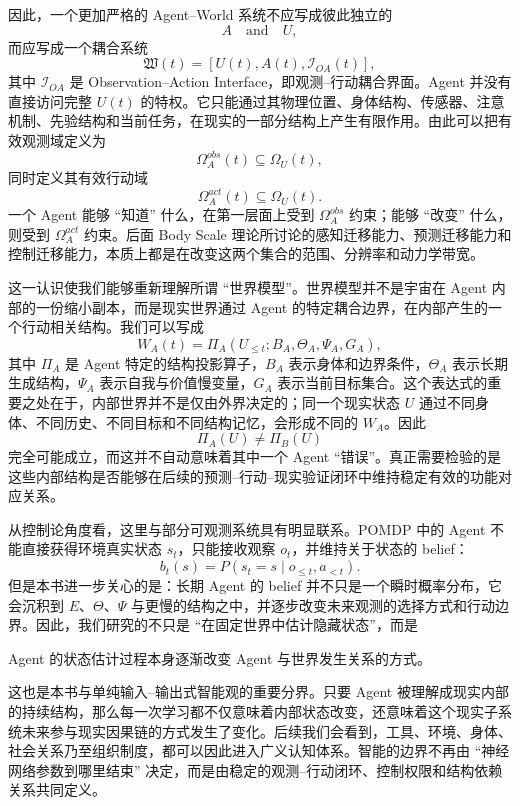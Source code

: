 因此，一个更加严格的 Agent--World 系统不应写成彼此独立的
\[
A \quad \text{and} \quad U,
\]
而应写成一个耦合系统
\[
\mathfrak{W}(t)
=
\left[
U(t),A(t),\mathcal{I}_{OA}(t)
\right],
\]
其中 $\mathcal{I}_{OA}$ 是 Observation--Action Interface，即观测--行动耦合界面。Agent 并没有直接访问完整 $U(t)$ 的特权。它只能通过其物理位置、身体结构、传感器、注意机制、先验结构和当前任务，在现实的一部分结构上产生有限作用。由此可以把有效观测域定义为
\[
\Omega_A^{obs}(t)
\subseteq
\Omega_U(t),
\]
同时定义其有效行动域
\[
\Omega_A^{act}(t)
\subseteq
\Omega_U(t).
\]
一个 Agent 能够 ``知道'' 什么，在第一层面上受到 $\Omega_A^{obs}$ 约束；能够 ``改变'' 什么，则受到 $\Omega_A^{act}$ 约束。后面 Body Scale 理论所讨论的感知迁移能力、预测迁移能力和控制迁移能力，本质上都是在改变这两个集合的范围、分辨率和动力学带宽。

这一认识使我们能够重新理解所谓 ``世界模型''。世界模型并不是宇宙在 Agent 内部的一份缩小副本，而是现实世界通过 Agent 的特定耦合边界，在内部产生的一个行动相关结构。我们可以写成
\[
W_A(t)
=
\Pi_A
\left(
U_{\leq t};
B_A,
\Theta_A,
\Psi_A,
G_A
\right),
\]
其中 $\Pi_A$ 是 Agent 特定的结构投影算子，$B_A$ 表示身体和边界条件，$\Theta_A$ 表示长期生成结构，$\Psi_A$ 表示自我与价值慢变量，$G_A$ 表示当前目标集合。这个表达式的重要之处在于，内部世界并不是仅由外界决定的；同一个现实状态 $U$ 通过不同身体、不同历史、不同目标和不同结构记忆，会形成不同的 $W_A$。因此
\[
\Pi_A(U)\neq \Pi_B(U)
\]
完全可能成立，而这并不自动意味着其中一个 Agent ``错误''。真正需要检验的是这些内部结构是否能够在后续的预测--行动--现实验证闭环中维持稳定有效的功能对应关系。

从控制论角度看，这里与部分可观测系统具有明显联系。POMDP 中的 Agent 不能直接获得环境真实状态 $s_t$，只能接收观察 $o_t$，并维持关于状态的 belief：
\[
b_t(s)
=
P(s_t=s\mid o_{\leq t},a_{<t}).
\]
但是本书进一步关心的是：长期 Agent 的 belief 并不只是一个瞬时概率分布，它会沉积到 $E$、$\Theta$、$\Psi$ 与更慢的结构之中，并逐步改变未来观测的选择方式和行动边界。因此，我们研究的不只是 ``在固定世界中估计隐藏状态''，而是
\begin{remark}
Agent 的状态估计过程本身逐渐改变 Agent 与世界发生关系的方式。
\end{remark}

这也是本书与单纯输入--输出式智能观的重要分界。只要 Agent 被理解成现实内部的持续结构，那么每一次学习都不仅意味着内部状态改变，还意味着这个现实子系统未来参与现实因果链的方式发生了变化。后续我们会看到，工具、环境、身体、社会关系乃至组织制度，都可以因此进入广义认知体系。智能的边界不再由 ``神经网络参数到哪里结束'' 决定，而是由稳定的观测--行动闭环、控制权限和结构依赖关系共同定义。


